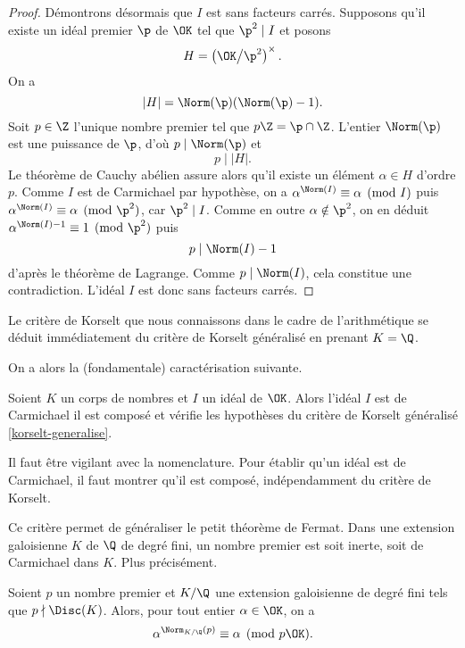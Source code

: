 \begin{proof}
	Démontrons désormais que $I$ est sans facteurs carrés. Supposons qu'il existe un idéal premier $\p$ de $\OK$ tel que $\p^2\mid I$ et posons \[H = \left(\OK\big/\p^2\right)^\times.\] On a \[\left|H\right| = \Norm(\p)(\Norm(\p) - 1).\] Soit $p\in \Z$ l'unique nombre premier tel que $p\Z = \p\cap \Z$. L'entier $\Norm(\p)$ est une puissance de $\p$, d'où $p\mid \Norm(\p)$ et \[p\mid \left| H \right|.\] Le théorème de Cauchy abélien assure alors qu'il existe un élément $\alpha \in H$ d'ordre $p$. Comme $I$ est de Carmichael par hypothèse, on a $\alpha^{\Norm(I)}\equiv \alpha \pmod{I}$ puis $\alpha^{\Norm(I)} \equiv \alpha \pmod{\p^2}$, car $\p^2\mid I$. Comme en outre $\alpha\notin \p^2$, on en déduit $\alpha^{\Norm(I) - 1} \equiv 1 \pmod{\p^2}$ puis \[p \mid \Norm(I) - 1\] d'après le théorème de Lagrange. Comme $p\mid \Norm(I)$, cela constitue une contradiction. L'idéal $I$ est donc sans facteurs carrés.
\end{proof}

\begin{remarque}
	Le critère de Korselt que nous connaissons dans le cadre de l'arithmétique se déduit immédiatement du critère de Korselt généralisé en prenant $K=\Q$.
\end{remarque}

On a alors la (fondamentale) caractérisation suivante.

\begin{corollaire}\label{carac-korselt}
	Soient $K$ un corps de nombres et $I$ un idéal de $\OK$. Alors l'idéal $I$ est de Carmichael \ssi il est composé et vérifie les hypothèses du critère de Korselt généralisé \ref{korselt-generalise}.
\end{corollaire}

\begin{remarque}
	Il faut être vigilant avec la nomenclature. Pour établir qu'un idéal est de Carmichael, il faut montrer qu'il est composé, indépendamment du critère de Korselt.
\end{remarque}

Ce critère permet de généraliser le petit théorème de Fermat. Dans une extension galoisienne $K$ de $\Q$ de degré fini, un nombre premier est soit inerte, soit de Carmichael dans $K$. Plus précisément.

\begin{theoreme}\label{ptf}
	Soient $p$ un nombre premier et $K/\Q$ une extension galoisienne de degré fini tels que $p\nmid \Disc(K)$. Alors, pour tout entier $\alpha \in \OK$, on a $$\alpha^{\Norm_{K/\Q}(p)} \equiv \alpha \pmod{p\OK}.$$
\end{theoreme}

